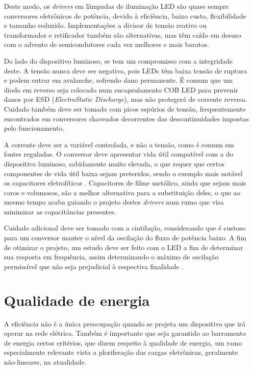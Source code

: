\documentclass[
        12pt,
        openany, %
        oneside, %
        a4paper,			
        english,			
        brazil
        ]{abntbibufjf}
\begin{document}
Deste modo, os \textit{drivers} em lâmpadas de iluminação LED são quase sempre conversores eletrônicos de potência, devido à eficiência, baixo custo, flexibilidade e tamanho reduzido. Implementações a divisor de tensão reativo ou transformador e retificador também são alternativas, mas têm caído em desuso com o advento de semicondutores cada vez melhores e mais baratos. 

Do lado do dispositivo luminoso, se tem um compromisso com a integridade deste. A tensão nunca deve ser negativa, pois LEDs têm baixa tensão de ruptura e podem entrar em avalanche, sofrendo dano permanente. É comum que um diodo em reverso seja colocado num encapsulamento COB LED para prevenir danos por ESD (\textit{ElectroStatic Discharge}), mas não protegerá de corrente reversa. Cuidado também deve ser tomado com picos espúrios de tensão, frequentemente encontrados em conversores chaveados decorrentes das descontinuidades impostas pelo funcionamento.

A corrente deve ser a variável controlada, e não a tensão, como é comum em fontes reguladas. O conversor deve apresentar vida útil compatível com a do dispositivo luminoso, sabidamente muito elevada, o que requer que certos componentes de vida útil baixa sejam preteridos, sendo o exemplo mais notável os capacitores eletrolíticos \cite{guilherme}. Capacitores de filme metálico, ainda que sejam mais caros e volumosos, são a melhor alternativa para a substituição deles, o que ao mesmo tempo acaba guiando o projeto destes \textit{drivers} num rumo que visa minimizar as capacitâncias presentes. 

Cuidado adicional deve ser tomado com a cintilação, considerando que é custoso para um conversor manter o nível da oscilação do fluxo de potência baixo. A fim de otimizar o projeto, um estudo deve ser feito com o LED a fim de determinar sua resposta em frequência, assim determinando o máximo de oscilação permissível que não seja prejudicial à respectiva finalidade \cite{ieee-flicker}.




\section{Qualidade de energia}

A eficiência não é a única preocupação quando se projeta um dispositivo que irá operar na rede elétrica. Também é importante que seja garantido ao barramento de energia certos critérios, que dizem respeito à qualidade de energia, um ramo especialmente relevante vista a ploriferação das cargas eletrônicas, geralmente não-lineares, na atualidade.
\end{document}
